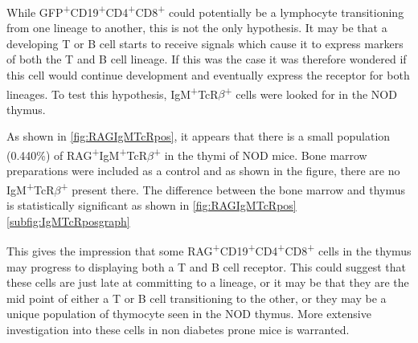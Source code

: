 While GFP\textsuperscript{+}CD19\textsuperscript{+}CD4\textsuperscript{+}CD8\textsuperscript{+} could potentially be a lymphocyte transitioning from one lineage to another, this is not the only hypothesis.
It may be that a developing T or B cell starts to receive signals which cause it to express markers of both the T and B cell lineage.
If this was the case it was therefore wondered if this cell would continue development and eventually express the receptor for both lineages.
To test this hypothesis, IgM\textsuperscript{+}TcR$\beta$\textsuperscript{+} cells were looked for in the NOD thymus.

As shown in \cref{fig:RAGIgMTcRpos}, it appears that there is a small population (0.440\%) of RAG\textsuperscript{+}IgM\textsuperscript{+}TcR$\beta$\textsuperscript{+} in the thymi of NOD  mice.
Bone marrow preparations were included as a control and as shown in the figure, there are no IgM\textsuperscript{+}TcR$\beta$\textsuperscript{+} present there.
The difference between the bone marrow and thymus is statistically significant as shown in \cref{fig:RAGIgMTcRpos}\ref{subfig:IgMTcRposgraph}

This gives the impression that some RAG\textsuperscript{+}CD19\textsuperscript{+}CD4\textsuperscript{+}CD8\textsuperscript{+} cells in the thymus may progress to displaying both a T and B cell receptor.
This could suggest that these cells are just late at committing to a lineage, or it may be that they are the mid point of either a T or B cell transitioning to the other, or they may be a unique population of thymocyte seen in the NOD thymus.
More extensive investigation into these cells in non diabetes prone mice is warranted.

